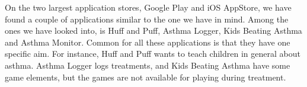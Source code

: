 \label{sec:exisiting-products}

On the two largest application stores, Google Play and iOS AppStore, we have found a couple of applications similar to the one we have in mind. Among the ones we have looked into, is Huff and Puff, Asthma Logger, Kids Beating Asthma and Asthma Monitor. Common for all these applications is that they have one specific aim. For instance, Huff and Puff wants to teach children in general about asthma. Asthma Logger logs treatments, and Kids Beating Asthma have some game elements, but the games are not available for playing during treatment. 


